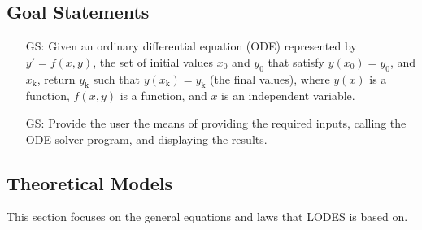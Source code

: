 \documentclass[12pt]{article}
\newcounter{goalnum} %
\newcommand{\progname}{LODES} %
\begin{document}
\subsection{Goal Statements} \label{Sec_gs}

\begin{itemize}

\item[GS\refstepcounter{goalnum}\thegoalnum \label{G_meaningfulLabel}:]{
Given an ordinary differential equation (ODE) represented by $y'= f(x,y)$, the set of initial values
$x_\text{0}$ and $y_\text{0}$ that satisfy $y(x_\text{0}) = y_\text{0}$, and $x_\text{k}$, return $y_\text{k}$
such that $y(x_\text{k}) = y_\text{k}$ (the final values), where $y(x)$ is a function, $f(x,y)$ is a function,
and $x$ is an independent variable.}

\item[GS\refstepcounter{goalnum}\thegoalnum \label{G_meaningfulLabel}:]{
Provide the user the means of providing the required inputs, calling the ODE solver program, and displaying the results.
}

\end{itemize}

\subsection{Theoretical Models}\label{sec_theoretical}

This section focuses on the general equations and laws that \progname{} is based
on.

~\newline
\end{document}
